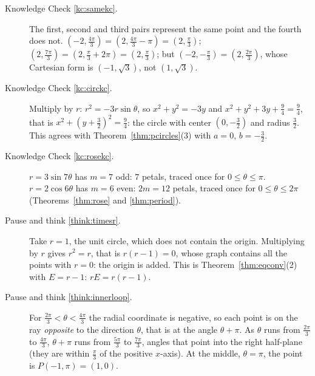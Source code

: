 \documentclass[11pt]{article}
\begin{document}
\begin{description}
  \item[Knowledge Check \ref{kc:samekc}.] The first, second and third pairs represent the same point and the fourth does not. $\left(-2,\frac{4\pi}3\right)=\left(2,\frac{4\pi}3-\pi\right)=\left(2,\frac\pi3\right)$; $\left(2,\frac{7\pi}3\right)=\left(2,\frac\pi3+2\pi\right)=\left(2,\frac\pi3\right)$; but $\left(-2,-\frac\pi3\right)=\left(2,\frac{2\pi}3\right)$, whose Cartesian form is $(-1,\sqrt3)$, not $(1,\sqrt3)$.
  \item[Knowledge Check \ref{kc:circkc}.] Multiply by $r$: $r^2=-3r\sin\theta$, so $x^2+y^2=-3y$ and $x^2+y^2+3y+\frac94=\frac94$, that is $x^2+\left(y+\frac32\right)^2=\frac94$: the circle with center $\left(0,-\frac32\right)$ and radius $\frac32$. This agrees with Theorem~\ref{thm:pcircles}(3) with $a=0$, $b=-\frac32$.
  \item[Knowledge Check \ref{kc:rosekc}.] $r=3\sin7\theta$ has $m=7$ odd: $7$ petals, traced once for $0\le\theta\le\pi$. $r=2\cos6\theta$ has $m=6$ even: $2m=12$ petals, traced once for $0\le\theta\le2\pi$ (Theorems~\ref{thm:rose} and \ref{thm:period}).
  \item[Pause and think \ref{think:timesr}.] Take $r=1$, the unit circle, which does not contain the origin. Multiplying by $r$ gives $r^2=r$, that is $r(r-1)=0$, whose graph contains all the points with $r=0$: the origin is added. This is Theorem~\ref{thm:eqconv}(2) with $E=r-1$: $rE=r(r-1)$.
  \item[Pause and think \ref{think:innerloop}.] For $\frac{2\pi}3<\theta<\frac{4\pi}3$ the radial coordinate is negative, so each point is on the ray \emph{opposite} to the direction $\theta$, that is at the angle $\theta+\pi$. As $\theta$ runs from $\frac{2\pi}3$ to $\frac{4\pi}3$, $\theta+\pi$ runs from $\frac{5\pi}3$ to $\frac{7\pi}3$, angles that point into the right half-plane (they are within $\frac\pi3$ of the positive $x$-axis). At the middle, $\theta=\pi$, the point is $P(-1,\pi)=(1,0)$.

\end{description}
\end{document}
